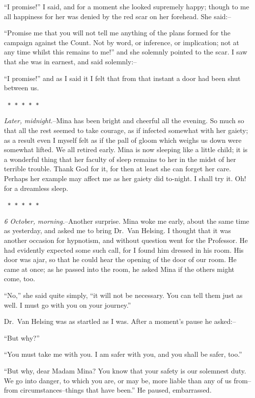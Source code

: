 \documentclass[12pt,openright]{book}
\begin{document}
“I promise!” I said, and for a moment she looked supremely happy; though to me all happiness for her was denied by the red scar on her forehead. She said:–

“Promise me that you will not tell me anything of the plans formed for the campaign against the Count. Not by word, or inference, or implication; not at any time whilst this remains to me!” and she solemnly pointed to the scar. I saw that she was in earnest, and said solemnly:–

“I promise!” and as I said it I felt that from that instant a door had been shut between us.

\texttt{   *       *       *       *       *}

\textit{Later, midnight.}–Mina has been bright and cheerful all the evening. So much so that all the rest seemed to take courage, as if infected somewhat with her gaiety; as a result even I myself felt as if the pall of gloom which weighs us down were somewhat lifted. We all retired early. Mina is now sleeping like a little child; it is a wonderful thing that her faculty of sleep remains to her in the midst of her terrible trouble. Thank God for it, for then at least she can forget her care. Perhaps her example may affect me as her gaiety did to-night. I shall try it. Oh! for a dreamless sleep.

\texttt{   *       *       *       *       *}

\textit{6 October, morning.}–Another surprise. Mina woke me early, about the same time as yesterday, and asked me to bring Dr. Van Helsing. I thought that it was another occasion for hypnotism, and without question went for the Professor. He had evidently expected some such call, for I found him dressed in his room. His door was ajar, so that he could hear the opening of the door of our room. He came at once; as he passed into the room, he asked Mina if the others might come, too.

“No,” she said quite simply, “it will not be necessary. You can tell them just as well. I must go with you on your journey.”

Dr. Van Helsing was as startled as I was. After a moment’s pause he asked:–

“But why?”

“You must take me with you. I am safer with you, and you shall be safer, too.”

“But why, dear Madam Mina? You know that your safety is our solemnest duty. We go into danger, to which you are, or may be, more liable than any of us from–from circumstances–things that have been.” He paused, embarrassed.
\end{document}
